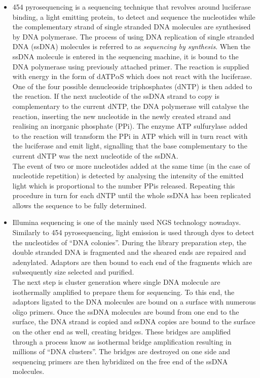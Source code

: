 \begin{itemize}
	
	\item 454 pyrosequencing \cite{margulies05} is a sequencing technique that revolves around luciferase binding, a light emitting protein, to detect and sequence the nucleotides while the complementary strand of single stranded DNA molecules are synthesised by DNA polymerase. The process of using DNA replication of single stranded DNA (ssDNA) molecules is referred to as \emph{sequencing by synthesis}. When the ssDNA molecule is entered in the sequencing machine, it is bound to the DNA polymerase using previously attached primer. The reaction is supplied with energy in the form of dATP$\alpha$S which does not react with the luciferase.\\
	
	One of the four possible denucleoside triphosphates (dNTP) is then added to the reaction. If the next nucleotide of the ssDNA strand to copy is complementary to the current dNTP, the DNA polymerase will catalyse the reaction, inserting the new nucleotide in the newly created strand and realising an inorganic phosphate (PPi). The enzyme ATP sulfurylase added to the reaction will transform the PPi in ATP which will in turn react with the luciferase and emit light, signalling that the base complementary to the current dNTP was the next nucleotide of the ssDNA.\\
	
	The event of two or more nucleotides added at the same time (in the case of nucleotide repetition) is detected by analysing the intensity of the emitted light which is proportional to the number PPis released. Repeating this procedure in turn for each dNTP until the whole ssDNA has been replicated allows the sequence to be fully determined.
	
	\item Illumina sequencing \cite{bentley08} is one of the mainly used NGS technology nowadays. Similarly to 454 pyrosequencing, light emission is used through dyes to detect the nucleotides of ``DNA colonies''. During the library preparation step, the double stranded DNA is fragmented and the sheared ends are repaired and adenylated. Adaptors are then bound to each end of the fragments which are subsequently size selected and purified.\\
	
	 The next step is cluster generation where single DNA molecule are isothermally amplified to prepare them for sequencing. To this end, the adaptors ligated to the DNA molecules are bound on a surface with numerous oligo primers. Once the ssDNA molecules are bound from one end to the surface, the DNA strand is copied and ssDNA copies are bound to the surface on the other end as well, creating bridges. These bridges are amplified through a process know as isothermal bridge amplification resulting in millions of ``DNA clusters''. The bridges are destroyed on one side and sequencing primers are then hybridized on the free end of the ssDNA molecules.\\
	 

\end{itemize}
